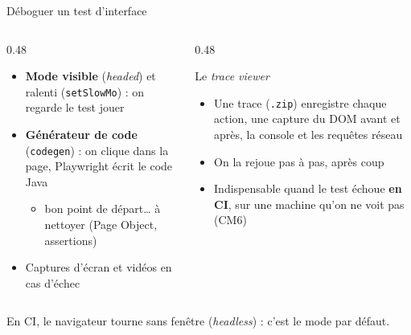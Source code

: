 \documentclass[aspectratio=169,10pt]{beamer}
\begin{document}
\begin{frame}{Déboguer un test d'interface}
  \begin{columns}[T]
    \begin{column}{0.48\textwidth}
      \begin{itemize}
        \item \textbf{Mode visible} (\textit{headed}) et ralenti (\texttt{setSlowMo}) : on regarde le test jouer
        \item \textbf{Générateur de code} (\texttt{codegen}) : on clique dans la page, Playwright écrit le code Java
          \begin{itemize}
            \item bon point de départ\ldots{} à nettoyer (Page Object, assertions)
          \end{itemize}
        \item Captures d'écran et vidéos en cas d'échec
      \end{itemize}
    \end{column}
    \begin{column}{0.48\textwidth}
      \begin{block}{Le \textit{trace viewer}}
        \begin{itemize}
          \item Une trace (\texttt{.zip}) enregistre chaque action, une capture du DOM avant et après, la console et les requêtes réseau
          \item On la rejoue pas à pas, après coup
          \item Indispensable quand le test échoue \textbf{en CI}, sur une machine qu'on ne voit pas (CM6)
        \end{itemize}
      \end{block}
    \end{column}
  \end{columns}
  \vspace{3mm}
  \begin{center}
    \small En CI, le navigateur tourne sans fenêtre (\textit{headless}) : c'est le mode par défaut.
  \end{center}
\end{frame}
\end{document}
